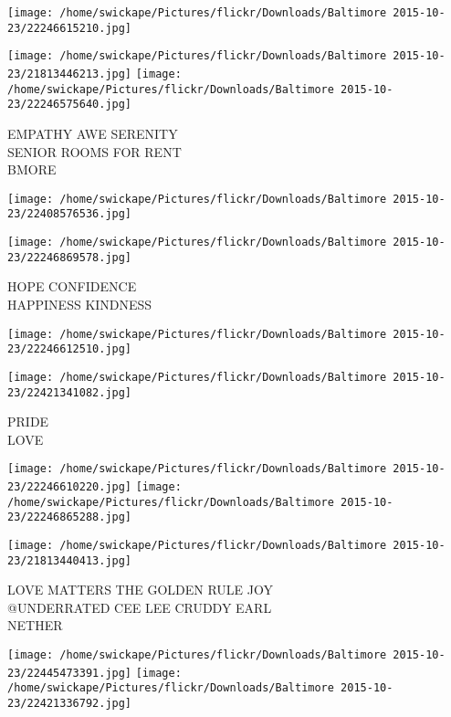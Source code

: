 \documentclass[10pt,letterpaper]{article}
\begin{document}
\texttt{[image: /home/swickape/Pictures/flickr/Downloads/Baltimore 2015-10-23/22246615210.jpg]}

\vspace{0.25in}
\texttt{[image: /home/swickape/Pictures/flickr/Downloads/Baltimore 2015-10-23/21813446213.jpg]}
\texttt{[image: /home/swickape/Pictures/flickr/Downloads/Baltimore 2015-10-23/22246575640.jpg]}

EMPATHY AWE SERENITY\\
SENIOR ROOMS FOR RENT\\
BMORE\\
\pagebreak

\texttt{[image: /home/swickape/Pictures/flickr/Downloads/Baltimore 2015-10-23/22408576536.jpg]}

\vspace{0.25in}
\texttt{[image: /home/swickape/Pictures/flickr/Downloads/Baltimore 2015-10-23/22246869578.jpg]}

HOPE CONFIDENCE\\
HAPPINESS KINDNESS\\
\pagebreak

\texttt{[image: /home/swickape/Pictures/flickr/Downloads/Baltimore 2015-10-23/22246612510.jpg]}

\vspace{0.25in}
\texttt{[image: /home/swickape/Pictures/flickr/Downloads/Baltimore 2015-10-23/22421341082.jpg]}

PRIDE\\
LOVE\\
\pagebreak

\texttt{[image: /home/swickape/Pictures/flickr/Downloads/Baltimore 2015-10-23/22246610220.jpg]}
\texttt{[image: /home/swickape/Pictures/flickr/Downloads/Baltimore 2015-10-23/22246865288.jpg]}

\vspace{0.25in}
\texttt{[image: /home/swickape/Pictures/flickr/Downloads/Baltimore 2015-10-23/21813440413.jpg]}

LOVE MATTERS THE GOLDEN RULE JOY\\
@UNDERRATED CEE LEE CRUDDY EARL\\
NETHER\\
\pagebreak

\texttt{[image: /home/swickape/Pictures/flickr/Downloads/Baltimore 2015-10-23/22445473391.jpg]}
\texttt{[image: /home/swickape/Pictures/flickr/Downloads/Baltimore 2015-10-23/22421336792.jpg]}
\end{document}
